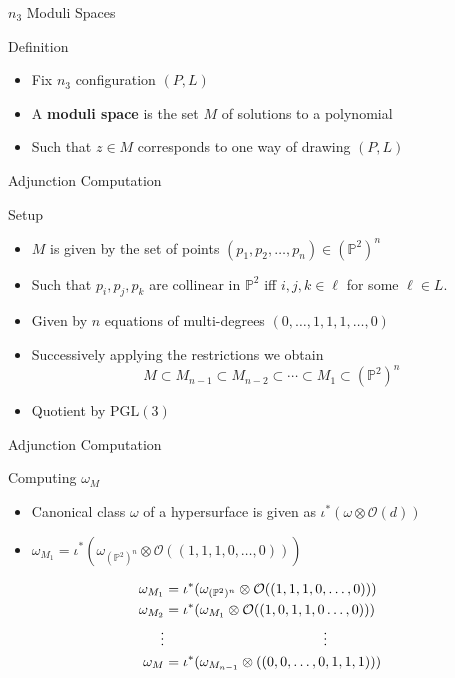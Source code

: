 \documentclass[aspectratio=169]{beamer}
\begin{document}
\begin{frame}{$n_3$ Moduli Spaces}
    \begin{block}{Definition}
        \begin{itemize}
            \item Fix $n_3$ configuration $(P, L)$
            \item A \textbf{moduli space} is the set $M$ of solutions to a polynomial 
            \item Such that $z \in M$ corresponds to one way of drawing $(P, L)$
        \end{itemize}
    \end{block}
\end{frame}


\begin{frame}{Adjunction Computation}
    \begin{block}{Setup}
        \begin{itemize}
            \item $M$ is given by the set of points $(p_1, p_2,\dots, p_n) \in (\mathbb{P}^2)^n$
            \item Such that $p_i,p_j,p_k$ are collinear in $\mathbb{P}^2$ iff $i,j,k \in \ell$ for some $\ell \in L$.
            \item Given by $n$ equations of multi-degrees $(0,\dots,1,1,1,\dots,0)$
            \item Successively applying the restrictions we obtain 
                \[M \subset M_{n - 1} \subset M_{n - 2} \subset \cdots \subset M_{1} \subset (\mathbb{P}^2)^n\]
            \item Quotient by $\text{PGL}(3)$
        \end{itemize}
    \end{block}
\end{frame}

\begin{frame}{Adjunction Computation}
    \begin{block}{Computing $\omega_M$}
        \begin{itemize}
            \item Canonical class $\omega$ of a hypersurface is given as $\iota^* (\omega \otimes \mathcal{O}(d))$
            \item $\omega_{M_1} = \iota^\ast(\omega_{(\mathbb{P}^2)^n} \otimes \mathcal{O}((1,1,1,0,\dots,0)))$
        \end{itemize}
        \begin{align*}
            \omega_{M_1} &= \iota^\ast(\omega_{(\mathbb{P}^2)^n} \otimes \mathcal{O}((1,1,1,0,\dots,0))) \\
            \omega_{M_2} &= \iota^\ast(\omega_{M_1} \otimes \mathcal{O}((1,0,1,1,0\dots,0))) \\
            \vdots &\hspace{40mm} \vdots \\
            \omega_{M} &= \iota^\ast(\omega_{M_{n-1}} \otimes((0,0,\dots,0,1,1,1)))
        \end{align*}
    \end{block}
\end{frame}
\end{document}
